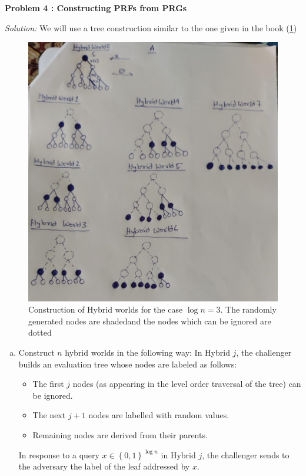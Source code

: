 \documentclass[a4paper, 11pt]{article}
\newenvironment{solution}
    {\textit{Solution:}}
    {\clearpage}
\newcommand{\prob}[1]{\begin{mdframed}[backgroundcolor=gray!20] \textbf{Problem #1}\end{mdframed}}
\newcommand{\bit}{\left\{0, 1\right\}}
\begin{document}
\prob{4 : Constructing PRFs from PRGs}
\begin{solution}
    We will use a tree construction similar to the one given in the book (\cref{fig:TC})
    \begin{figure}[!ht]
        \centering
        \includegraphics[scale=0.25]{images/Tree Construction.png}
        \caption{Construction of Hybrid worlds for the case $\log n=3$. The randomly generated nodes are shadedand the nodes which can be ignored are dotted}
        \label{fig:TC}
    \end{figure}
    \begin{enumerate}[(a)]
        \item  Construct $n$ hybrid worlds in the following way: In Hybrid $j$, the challenger builds an evaluation tree whose nodes are labeled as follows:
              \begin{itemize}
                  \item The first $j$ nodes (as appearing in the level order traversal of the tree) can be ignored.
                  \item The next $j + 1$ nodes are labelled with random values. 
                  \item Remaining nodes are derived from their parents.
              \end{itemize}
              In response to a query $x\in\bit^{\log n}$ in Hybrid $j$, the challenger sends to the adversary the label of the leaf addressed by $x$.


\end{enumerate}
\end{solution}
\end{document}
